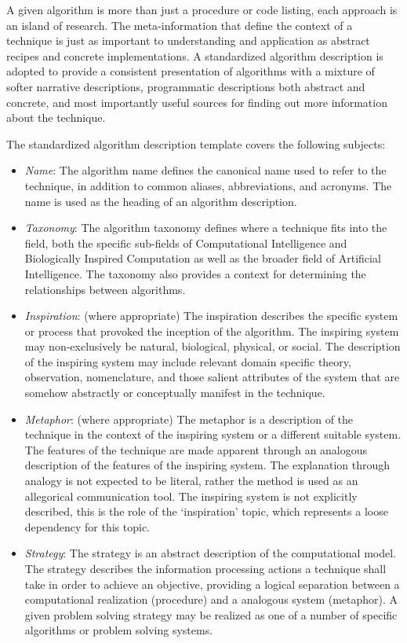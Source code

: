 \begin{bibunit}
A given algorithm is more than just a procedure or code listing, each approach is an island of research. The meta-information that define the context of a technique is just as important to understanding and application as abstract recipes and concrete implementations. A standardized algorithm description is adopted to provide a consistent presentation of algorithms with a mixture of softer narrative descriptions, programmatic descriptions both abstract and concrete, and most importantly useful sources for finding out more information about the technique.

The standardized algorithm description template covers the following subjects:
\begin{itemize}
	\item \emph{Name}: The algorithm name defines the canonical name used to refer to the technique, in addition to common aliases, abbreviations, and acronyms. The name is used as the heading of an algorithm description.
	\item \emph{Taxonomy}: The algorithm taxonomy defines where a technique fits into the field, both the specific sub-fields of Computational Intelligence and Biologically Inspired Computation as well as the broader field of Artificial Intelligence. The taxonomy also provides a context for determining the relationships between algorithms.
	\item \emph{Inspiration}: (where appropriate) The inspiration describes the specific system or process that provoked the inception of the algorithm. The inspiring system may non-exclusively be natural, biological, physical, or social. The description of the inspiring system may include relevant domain specific theory, observation, nomenclature, and those salient attributes of the system that are somehow abstractly or conceptually manifest in the technique.
	\item \emph{Metaphor}: (where appropriate) The metaphor is a description of the technique in the context of the inspiring system or a different suitable system. The features of the technique are made apparent through an analogous description of the features of the inspiring system. The explanation through analogy is not expected to be literal, rather the method is used as an allegorical communication tool. The inspiring system is not explicitly described, this is the role of the `inspiration' topic, which represents a loose dependency for this topic.
	\item \emph{Strategy}: The strategy is an abstract description of the computational model. The strategy describes the information processing actions a technique shall take in order to achieve an objective, providing a logical separation between a computational realization (procedure) and a analogous system (metaphor). A given problem solving strategy may be realized as one of a number of specific algorithms or problem solving systems.

\end{itemize}
\end{bibunit}

